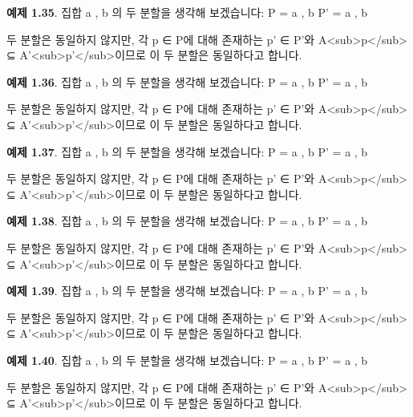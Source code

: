 \documentclass[11pt, a4paper, twoside, openany]{book}
\begin{document}
\par\medskip
\textbf{예제 1.35}. 집합 { a , b }의 두 분할을 생각해 보겠습니다:
P = { { a } , { b } }
P' = { { a , b } }

\par\medskip
두 분할은 동일하지 않지만, 각 p ∈ P\hspace{0pt}에 대해 존재하는 p' ∈ P'와 A<sub>p</sub> ⊆ A'<sub>p'</sub>이므로 이 두 분할은 동일하다고 합니다.

\par\medskip
\textbf{예제 1.36}. 집합 { a , b }의 두 분할을 생각해 보겠습니다:
P = { { a } , { b } }
P' = { { a , b } }

\par\medskip
두 분할은 동일하지 않지만, 각 p ∈ P\hspace{0pt}에 대해 존재하는 p' ∈ P'와 A<sub>p</sub> ⊆ A'<sub>p'</sub>이므로 이 두 분할은 동일하다고 합니다.

\par\medskip
\textbf{예제 1.37}. 집합 { a , b }의 두 분할을 생각해 보겠습니다:
P = { { a } , { b } }
P' = { { a , b } }

\par\medskip
두 분할은 동일하지 않지만, 각 p ∈ P\hspace{0pt}에 대해 존재하는 p' ∈ P'와 A<sub>p</sub> ⊆ A'<sub>p'</sub>이므로 이 두 분할은 동일하다고 합니다.

\par\medskip
\textbf{예제 1.38}. 집합 { a , b }의 두 분할을 생각해 보겠습니다:
P = { { a } , { b } }
P' = { { a , b } }

\par\medskip
두 분할은 동일하지 않지만, 각 p ∈ P\hspace{0pt}에 대해 존재하는 p' ∈ P'와 A<sub>p</sub> ⊆ A'<sub>p'</sub>이므로 이 두 분할은 동일하다고 합니다.

\par\medskip
\textbf{예제 1.39}. 집합 { a , b }의 두 분할을 생각해 보겠습니다:
P = { { a } , { b } }
P' = { { a , b } }

\par\medskip
두 분할은 동일하지 않지만, 각 p ∈ P\hspace{0pt}에 대해 존재하는 p' ∈ P'와 A<sub>p</sub> ⊆ A'<sub>p'</sub>이므로 이 두 분할은 동일하다고 합니다.

\par\medskip
\textbf{예제 1.40}. 집합 { a , b }의 두 분할을 생각해 보겠습니다:
P = { { a } , { b } }
P' = { { a , b } }

\par\medskip
두 분할은 동일하지 않지만, 각 p ∈ P\hspace{0pt}에 대해 존재하는 p' ∈ P'와 A<sub>p</sub> ⊆ A'<sub>p'</sub>이므로 이 두 분할은 동일하다고 합니다.
\end{document}
